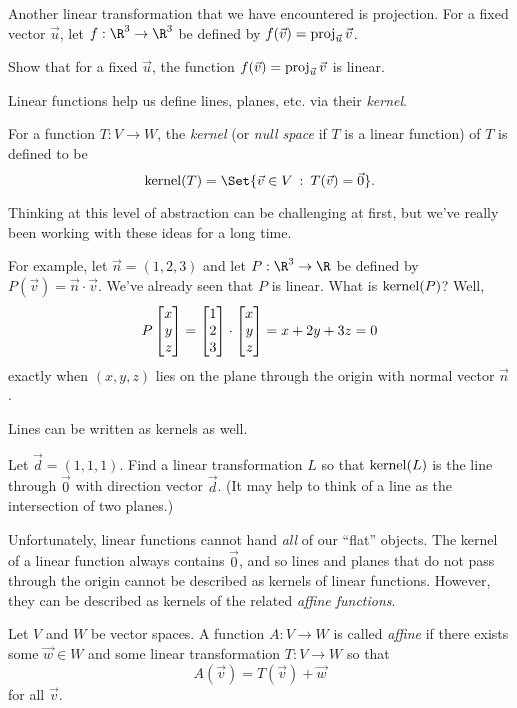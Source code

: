 Another linear transformation that we have encountered is projection.
For a fixed vector $\vec u$, let $f:\R^3\to\R^3$ be defined by 
$f(\vec v) = \operatorname{proj}_{\vec u} \vec v$.

\begin{exercise}
	Show that for a fixed $\vec u$, the function 
	$f(\vec v) = \operatorname{proj}_{\vec u} \vec v$ is linear.
\end{exercise}

Linear functions help us define lines, planes, etc. via their \emph{kernel}.

\begin{definition}[Kernel]
	For a function $T:V\to W$, the \emph{kernel} (or \emph{null space}
	if $T$ is a linear function)
	of $T$ is defined to be 
	\[
		\Ker(T) = \Set{\vec v\in V\given T(\vec v) = \vec 0}.
	\]
\end{definition}

Thinking at this level of abstraction can be challenging at first,
but we've really been working with these ideas for a long time.

For example, let $\vec n = (1,2,3)$ and let $P:\R^3\to\R$ be defined by
$P(\vec v) = \vec n\cdot \vec v$.  We've already seen that $P$ is linear.
What is $\operatorname{kernel}(P)$?  Well,
\[
	P\mat{x\\y\\z} = \mat{1\\2\\3}\cdot \mat{x\\y\\z} = 
	x+2y+3z=0
\]
exactly when $(x,y,z)$ lies on the plane through the origin with normal vector $\vec n$.

Lines can be written as kernels as well.

\begin{exercise}
	Let $\vec d=(1,1,1)$.  Find a linear transformation $L$ so that
	$\operatorname{kernel}(L)$ is the line through $\vec 0$ with direction vector $\vec d$.
	(It may help to think of a line as the intersection of two planes.)
\end{exercise}

Unfortunately, linear functions cannot hand \emph{all} of our ``flat''
objects.  The kernel of a linear function always contains $\vec 0$, and
so lines and planes that do not pass through the origin cannot be described
as kernels of linear functions.  However, they can be described as kernels
of the related \emph{affine functions}.

\begin{definition}
	Let $V$ and $W$ be vector spaces.  A function $A:V\to W$ is called
	\emph{affine} if there exists some $\vec w\in W$ and some linear transformation
	$T:V\to W$ so that
	\[
		A(\vec v) = T(\vec v) + \vec w
	\]
	for all $\vec v$.
\end{definition}

